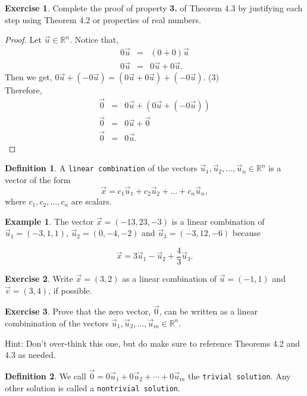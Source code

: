 \documentclass{beamer}
\newcommand{\R}{\mathbb{R}}
\newcommand{\fn}{\insertframenumber}
\theoremstyle{definition}
\newtheorem{exercise}{Exercise}
\newtheorem*{defn}{Definition}
\newtheorem*{exa}{Example}
\renewcommand{\emph}[1]{{\color{blue}\texttt{#1}}}
\begin{document}
\begin{frame}{\fn}
	\begin{exercise}
		Complete the proof of property \textbf{3.} of Theorem 4.3 by justifying each step using Theorem 4.2 or properties of real numbers.
		\begin{proof}
			Let $\vec u\in\R^n$. Notice that,
			\begin{eqnarray}
			0\vec u&=&(0+0)\vec u\\
			0\vec u &=&0\vec u+0\vec u.
			\end{eqnarray}
			Then we get, $ 
			0\vec u+(-0\vec u)=(0\vec u+ 0\vec u)+(-0\vec u).$ \hfill(3)\\ 
			Therefore,
			\begin{eqnarray}
			\vec 0&=&0\vec u+(0\vec u+(-0\vec u))\\
			\vec 0&=&0\vec u+\vec 0\\
			\vec 0&=&0\vec u.
			\end{eqnarray}
		\end{proof}
	\end{exercise}
\end{frame}
\begin{frame}{\fn}
	\begin{defn}
		A \emph{linear combination} of the vectors $\vec u_1,\vec u_2,\dots,\vec u_n\in\R^n$ is a vector of the form
			\[\vec x = c_1\vec u_1+c_2\vec u_2+\dots+c_n\vec u_n,\]
		where $c_1,c_2,\dots,c_n$ are scalars.
	\end{defn}
	\begin{exa}
		The vector $\vec x=(-13,23,-3)$ is a linear combination of $\vec u_1=(-3,1,1)$, $\vec u_2=(0,-4,-2)$ and $\vec u_3=(-3,12,-6)$ because
		
			\[\vec x=3\vec u_1-\vec u_2+\frac{4}{3}\vec u_3.\]
	\end{exa}
\end{frame}
\begin{frame}{\fn}
	\begin{exercise}
		Write $\vec x=(3,2)$ as a linear combination of $\vec u=(-1,1)$ and $\vec v=(3,4)$, if possible.
	\end{exercise}
	\begin{exercise}
		Prove that the zero vector, $\vec 0$, can be written as a linear combinination of the vectors $\vec u_1,\vec u_2,\dots,\vec u_m\in\R^n$. 
		
		Hint: Don't over-think this one, but do make sure to reference Theorems 4.2 and 4.3 as needed.
	\end{exercise}\pause
	\begin{defn}
		We call $\vec 0=0\vec u_1+0\vec u_2+\cdots+0\vec u_m$ the \emph{trivial solution}.  Any other solution is called a \emph{nontrivial solution}.
	\end{defn}
\end{frame}
\end{document}
